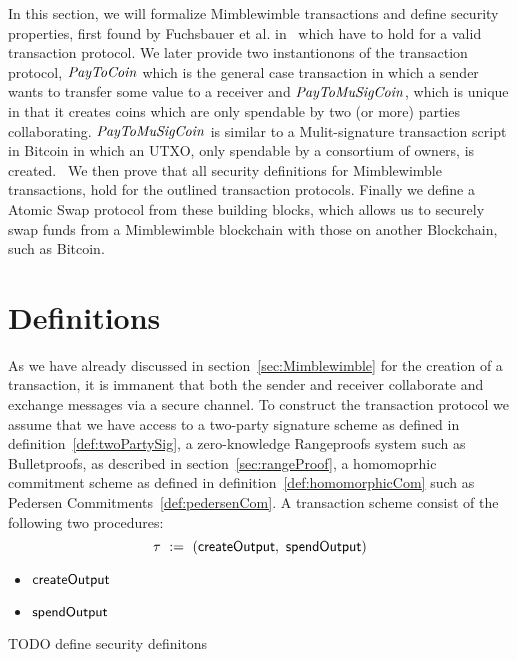 In this section, we will formalize Mimblewimble transactions and define security properties, first found by Fuchsbauer et al. in~\cite{fuchsbauer2019aggregate} which have to hold for a valid transaction protocol.
We later provide two instantionons of the transaction protocol, $\mathit{PayToCoin}$ which is the general case transaction in which a sender wants to transfer some value to a receiver
and $\mathit{PayToMuSigCoin}$, which is unique in that it creates coins which are only spendable by two (or more) parties collaborating. $\mathit{PayToMuSigCoin}$ is similar
to a Mulit-signature transaction script in Bitcoin in which an UTXO, only spendable by a consortium of owners, is created.~\cite{bistarelli2018analysis}
We then prove that all security definitions for Mimblewimble transactions, hold for the outlined transaction protocols.
Finally we define a Atomic Swap protocol from these building blocks, which allows us to securely swap funds from a Mimblewimble blockchain with those on another Blockchain, such as Bitcoin.

\section{Definitions}\label{sec:atomic-def}

\begin{definition}\label{def:tx}
    As we have already discussed in section~\ref{sec:Mimblewimble} for the creation of a transaction, it is immanent that both the sender and receiver collaborate and exchange messages via a secure channel.
    To construct the transaction protocol we assume that we have access to a two-party signature scheme as defined in definition~\ref{def:twoPartySig}, a zero-knowledge Rangeproofs system such as Bulletproofs, as
    described in section~\ref{sec:rangeProof}, a homomoprhic commitment scheme as defined in definition~\ref{def:homomorphicCom} such as Pedersen Commitments~\ref{def:pedersenCom}.
    A transaction scheme consist of the following two procedures:
    \[ \tau ~:=~ ( \mathsf{createOutput} ,~ \mathsf{spendOutput} ) \]
    \begin{itemize}
        \item $\mathsf{createOutput}$
        \item $\mathsf{spendOutput}$
    \end{itemize}
\end{definition}

TODO define security definitons

